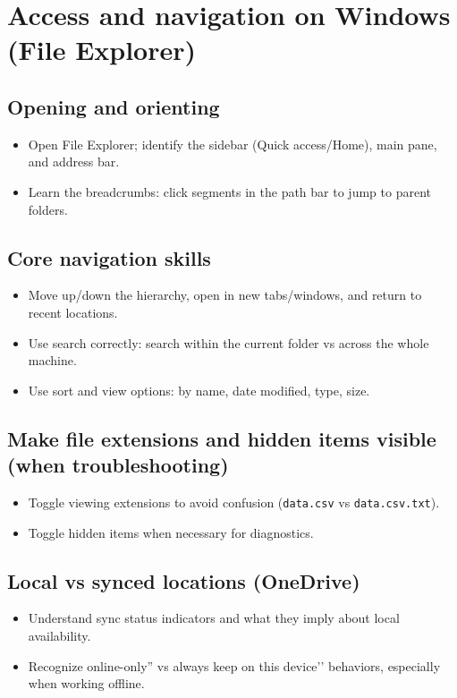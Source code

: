 \section{Access and navigation on Windows (File Explorer)}
\subsection{Opening and orienting}
\begin{itemize}
\item Open File Explorer; identify the sidebar (Quick access/Home), main pane, and address bar.
\item Learn the breadcrumbs: click segments in the path bar to jump to parent folders.
\end{itemize}

\subsection{Core navigation skills}
\begin{itemize}
\item Move up/down the hierarchy, open in new tabs/windows, and return to recent locations.
\item Use search correctly: search within the current folder vs across the whole machine.
\item Use sort and view options: by name, date modified, type, size.
\end{itemize}

\subsection{Make file extensions and hidden items visible (when troubleshooting)}
\begin{itemize}
\item Toggle viewing extensions to avoid confusion (\texttt{data.csv} vs \texttt{data.csv.txt}).
\item Toggle hidden items when necessary for diagnostics.
\end{itemize}

\subsection{Local vs synced locations (OneDrive)}
\begin{itemize}
\item Understand sync status indicators and what they imply about local availability.
\item Recognize online-only'' vs always keep on this device’’ behaviors, especially when working offline.
\end{itemize}

